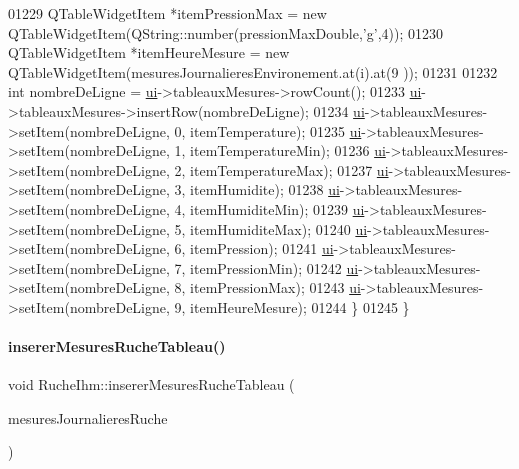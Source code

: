 \begin{DoxyCode}
01229         QTableWidgetItem *itemPressionMax = \textcolor{keyword}{new} QTableWidgetItem(QString::number(pressionMaxDouble,\textcolor{charliteral}{'g'},4));
01230         QTableWidgetItem *itemHeureMesure = \textcolor{keyword}{new} QTableWidgetItem(mesuresJournalieresEnvironement.at(i).at(9
      ));
01231 
01232         \textcolor{keywordtype}{int} nombreDeLigne = \hyperlink{class_ruche_ihm_a64786058bd7f88ca2f1e9743bb27c25b}{ui}->tableauxMesures->rowCount();
01233         \hyperlink{class_ruche_ihm_a64786058bd7f88ca2f1e9743bb27c25b}{ui}->tableauxMesures->insertRow(nombreDeLigne);
01234         \hyperlink{class_ruche_ihm_a64786058bd7f88ca2f1e9743bb27c25b}{ui}->tableauxMesures->setItem(nombreDeLigne, 0, itemTemperature);
01235         \hyperlink{class_ruche_ihm_a64786058bd7f88ca2f1e9743bb27c25b}{ui}->tableauxMesures->setItem(nombreDeLigne, 1, itemTemperatureMin);
01236         \hyperlink{class_ruche_ihm_a64786058bd7f88ca2f1e9743bb27c25b}{ui}->tableauxMesures->setItem(nombreDeLigne, 2, itemTemperatureMax);
01237         \hyperlink{class_ruche_ihm_a64786058bd7f88ca2f1e9743bb27c25b}{ui}->tableauxMesures->setItem(nombreDeLigne, 3, itemHumidite);
01238         \hyperlink{class_ruche_ihm_a64786058bd7f88ca2f1e9743bb27c25b}{ui}->tableauxMesures->setItem(nombreDeLigne, 4, itemHumiditeMin);
01239         \hyperlink{class_ruche_ihm_a64786058bd7f88ca2f1e9743bb27c25b}{ui}->tableauxMesures->setItem(nombreDeLigne, 5, itemHumiditeMax);
01240         \hyperlink{class_ruche_ihm_a64786058bd7f88ca2f1e9743bb27c25b}{ui}->tableauxMesures->setItem(nombreDeLigne, 6, itemPression);
01241         \hyperlink{class_ruche_ihm_a64786058bd7f88ca2f1e9743bb27c25b}{ui}->tableauxMesures->setItem(nombreDeLigne, 7, itemPressionMin);
01242         \hyperlink{class_ruche_ihm_a64786058bd7f88ca2f1e9743bb27c25b}{ui}->tableauxMesures->setItem(nombreDeLigne, 8, itemPressionMax);
01243         \hyperlink{class_ruche_ihm_a64786058bd7f88ca2f1e9743bb27c25b}{ui}->tableauxMesures->setItem(nombreDeLigne, 9, itemHeureMesure);
01244     \}
01245 \}
\end{DoxyCode}
\mbox{\label{class_ruche_ihm_afada4cd970c0e34c3fd62d63e5af7a88}} 
\paragraph{\texorpdfstring{inserer\+Mesures\+Ruche\+Tableau()}{insererMesuresRucheTableau()}}
{\footnotesize\ttfamily void Ruche\+Ihm\+::inserer\+Mesures\+Ruche\+Tableau (\begin{DoxyParamCaption}\item[{Q\+Vector$<$ Q\+String\+List $>$}]{mesures\+Journalieres\+Ruche }\end{DoxyParamCaption})\hspace{0.3cm}{\ttfamily [private]}}



